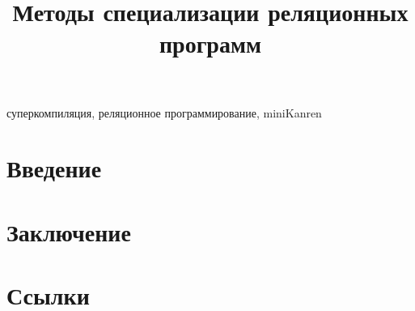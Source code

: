 \documentclass[conference]{IEEEtran}
\begin{document}
\title{Методы специализации реляционных программ\\
}

\author{
}

\maketitle

\begin{abstract}

\end{abstract}

\begin{IEEEkeywords}
    суперкомпиляция, реляционное программирование, miniKanren
\end{IEEEkeywords}

\section{Введение}


\section*{Заключение}

\section*{Ссылки}



\end{document}
